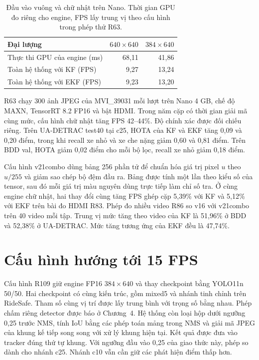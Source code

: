 \begin{table}[htbp]\centering
\caption{Đầu vào vuông và chữ nhật trên Nano. Thời gian GPU đo riêng cho engine, FPS lấy trung vị theo cấu hình trong phép thử R63.}\label{tab:nano}
\begin{tabular}{lrr}\toprule
Đại lượng & $640\times640$ & $384\times640$\\\midrule
Thực thi GPU của engine (ms) & 68,11 & 41,86\\
Toàn hệ thống với KF (FPS) & 9,27 & 13,24\\
Toàn hệ thống với EKF (FPS) & 9,23 & 13,20\\\bottomrule
\end{tabular}
\end{table}
R63 chạy 300 ảnh JPEG của MVI\_39031 mỗi lượt trên Nano 4 GB, chế độ MAXN, TensorRT 8.2 FP16 và bật HDMI. Trong năm cặp có thời gian giải mã cùng mức, cấu hình chữ nhật tăng FPS 42--44\%. Độ chính xác được đối chiếu riêng. Trên UA-DETRAC test40 tại c25, HOTA của KF và EKF tăng 0,09 và 0,20 điểm, trong khi recall xe nhỏ và xe che nặng giảm 0,60 và 0,81 điểm. Trên BDD val, HOTA giảm 0,02 điểm cho mỗi bộ lọc, recall xe nhỏ giảm 0,18 điểm.

Cấu hình v21combo dùng bảng 256 phần tử để chuẩn hóa giá trị pixel $u$ theo $u/255$ và giảm sao chép bộ đệm đầu ra. Bảng được tính một lần theo kiểu số của tensor, sau đó mỗi giá trị màu nguyên dùng trực tiếp làm chỉ số tra. Ở cùng engine chữ nhật, hai thay đổi cùng tăng FPS ghép cặp 5,39\% với KF và 5,12\% với EKF trên bài đo HDMI R83. Phép đo nhiều video R86 so v16 với v21combo trên 40 video mỗi tập. Trung vị mức tăng theo video của KF là 51,96\% ở BDD và 52,38\% ở UA-DETRAC. Mức tăng tương ứng của EKF đều là 47,74\%. 

\section{Cấu hình hướng tới 15 FPS}
Cấu hình R109 giữ engine FP16 $384\times640$ và thay checkpoint bằng YOLO11n 50/50. Hai checkpoint có cùng kiến trúc, gồm mixed5 và nhánh tinh chỉnh trên RideSafe. Tham số cùng vị trí được lấy trung bình với trọng số bằng nhau. Phép chấm riêng detector được báo ở Chương~4. Hệ thống còn loại hộp dưới ngưỡng 0,25 trước NMS, tính IoU bằng các phép toán mảng trong NMS và giải mã JPEG của khung kế tiếp song song với xử lý khung hiện tại. Kết quả được đưa vào tracker đúng thứ tự khung. Với ngưỡng đầu vào 0,25 của giao thức này, phép so dành cho nhánh c25. Nhánh c10 vẫn cần giữ các phát hiện điểm thấp hơn.

